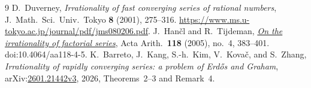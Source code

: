\documentclass[11pt]{article}
\begin{document}
\begin{thebibliography}{9}
  D.~Duverney,
  \emph{Irrationality of fast converging series of rational numbers},
  J.\ Math.\ Sci.\ Univ.\ Tokyo \textbf{8} (2001), 275--316.
  \url{https://www.ms.u-tokyo.ac.jp/journal/pdf/jms080206.pdf}.
  J.~Han\v{c}l and R.~Tijdeman,
  \href{https://geodesic.mathdoc.fr/articles/10.4064/aa118-4-5/}
  {\emph{On the irrationality of factorial series}},
  Acta Arith.\ \textbf{118} (2005), no.~4, 383--401.
  doi:10.4064/aa118-4-5.
  K.~Barreto, J.~Kang, S.-h.~Kim, V.~Kova\v{c}, and S.~Zhang,
  \emph{Irrationality of rapidly converging series: a problem of Erd\H{o}s
  and Graham},
  arXiv:\href{https://arxiv.org/abs/2601.21442v3}{2601.21442v3}, 2026,
  Theorems~2--3 and Remark~4.
\end{thebibliography}
\end{document}
